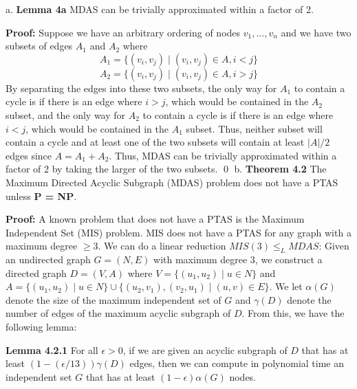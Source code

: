 \documentclass[oneside]{homework} %
\begin{document}
{\large a.} \textbf{Lemma 4a} MDAS can be trivially approximated within a factor of 2.
\newline

\textbf{Proof:} Suppose we have an arbitrary ordering of nodes $v_1, ..., v_n$ and we have two subsets of edges $A_1$ and $A_2$ where $$A_1 = \{(v_i, v_j) \mid (v_i, v_j) \in A, i < j\}$$ $$A_2 = \{(v_i, v_j) \mid (v_i, v_j) \in A, i > j\}$$ By separating the edges into these two subsets, the only way for $A_1$ to contain a cycle is if there is an edge where $i > j$, which would be contained in the $A_2$ subset, and the only way for $A_2$ to contain a cycle is if there is an edge where $ i < j$, which would be contained in the $A_1$ subset. Thus, neither subset will contain a cycle and at least one of the two subsets will contain at least $|A|/2$ edges since $A = A_1 + A_2$. Thus, MDAS can be trivially approximated within a factor of 2 by taking the larger of the two subsets. \hfill\qed
\newline
\newline
{\large b.} \textbf{Theorem 4.2} The Maximum Directed Acyclic Subgraph (MDAS) problem does not have a PTAS unless \textbf{P = NP}.
\newline

\textbf{Proof:} A known problem that does not have a PTAS is the Maximum Independent Set (MIS) problem. MIS does not have a PTAS for any graph with a maximum degree $\geq 3$. We can do a linear reduction $MIS(3) \leq_L MDAS$: Given an undirected graph $G = (N, E)$ with maximum degree 3, we construct a directed graph $D = (V, A)$ where $V = \{(u_1, u_2) \mid u \in N\}$ and $A = \{(u_1, u_2) \mid u \in N\}  \cup \{(u_2, v_1),(v_2, u_1) \mid (u, v) \in E\}$. We let $\alpha(G)$ denote the size of the maximum independent set of $G$ and $\gamma(D)$ denote the number of edges of the maximum acyclic subgraph of $D$. From this, we have the following lemma:
\newline

\textbf{Lemma 4.2.1} For all $\epsilon > 0$, if we are given an acyclic subgraph of $D$ that has at least $(1-(\epsilon/13))\gamma(D)$ edges, then we can compute in polynomial time an independent set $G$ that has at least $(1-\epsilon)\alpha(G)$ nodes.
\newline
\end{document}
